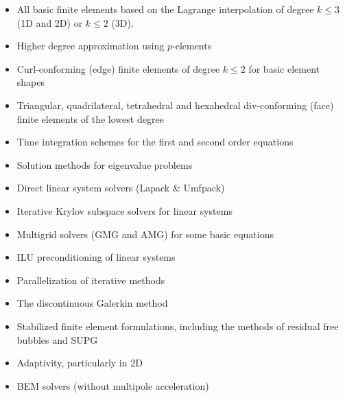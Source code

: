 \begin{itemize}
  \item All basic finite elements based on the Lagrange interpolation
of degree $k \le 3$ (1D and 2D) or $k \le 2$ (3D).
  \item Higher degree approximation using $p$-elements
  \item Curl-conforming (edge) finite elements of degree $k \le 2$ for basic element shapes
  \item Triangular, quadrilateral, tetrahedral and hexahedral div-conforming (face) finite elements of the lowest degree  
  \item Time integration schemes for the first and second order equations
  \item Solution methods for eigenvalue problems
  \item Direct linear system solvers (Lapack \& Umfpack)
  \item Iterative Krylov subspace solvers for linear systems
  \item Multigrid solvers (GMG and AMG) for some basic equations
  \item ILU preconditioning of linear systems
  \item Parallelization of iterative methods
  \item The discontinuous Galerkin method
  \item Stabilized finite element formulations, including the methods of residual free bubbles and SUPG
  \item Adaptivity, particularly in 2D 
  \item BEM solvers (without multipole acceleration)
\end{itemize}

